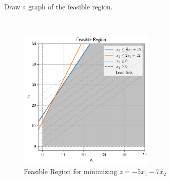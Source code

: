 Draw a graph of the feasible region.

\begin{solution}
  \ \\
  \begin{figure}[h]
    \centering
    \includegraphics[width=0.6\textwidth]{problem_5i.png}
    \caption{Feasible Region for minimizing $z = -5x_1 - 7x_2$}
    \label{fig:problem_5i}
  \end{figure}
  \ \\
\end{solution}